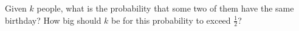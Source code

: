 

\setcounter{section}{2}
\setcounter{subsection}{5}
\setcounter{dfn}{11}

Given $k$ people, what is the probability that some two of them have the same birthday?
How big should $k$ be for this probability to exceed $\frac12$?













